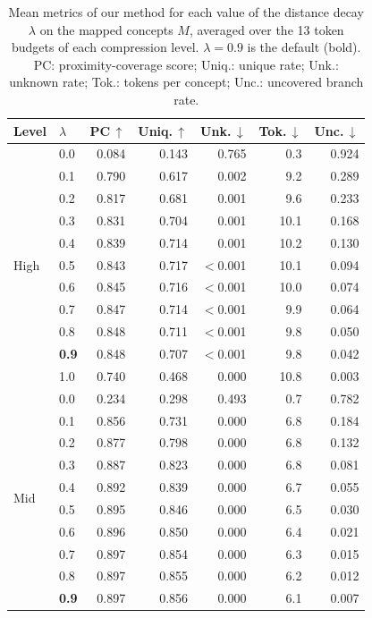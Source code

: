 \begin{table}[htbp]
\centering
\caption{Mean metrics of our method for each value of the distance decay $\lambda$ on the mapped concepts $M$, averaged over the 13 token budgets of each compression level. $\lambda = 0.9$ is the default (bold). PC: proximity-coverage score; Uniq.: unique rate; Unk.: unknown rate; Tok.: tokens per concept; Unc.: uncovered branch rate.}
\label{tab:lambda}
\footnotesize
\setlength{\tabcolsep}{4pt}
\begin{tabular}{@{}llrrrrr@{}}
\toprule
Level & $\lambda$ & PC\,$\uparrow$ & Uniq.\,$\uparrow$ & Unk.\,$\downarrow$ & Tok.\,$\downarrow$ & Unc.\,$\downarrow$ \\
\midrule
\multirow{11}{*}{High} & 0.0 & 0.084 & 0.143 & 0.765 & 0.3 & 0.924 \\
 & 0.1 & 0.790 & 0.617 & 0.002 & 9.2 & 0.289 \\
 & 0.2 & 0.817 & 0.681 & 0.001 & 9.6 & 0.233 \\
 & 0.3 & 0.831 & 0.704 & 0.001 & 10.1 & 0.168 \\
 & 0.4 & 0.839 & 0.714 & 0.001 & 10.2 & 0.130 \\
 & 0.5 & 0.843 & 0.717 & $<$0.001 & 10.1 & 0.094 \\
 & 0.6 & 0.845 & 0.716 & $<$0.001 & 10.0 & 0.074 \\
 & 0.7 & 0.847 & 0.714 & $<$0.001 & 9.9 & 0.064 \\
 & 0.8 & 0.848 & 0.711 & $<$0.001 & 9.8 & 0.050 \\
 & \textbf{0.9} & 0.848 & 0.707 & $<$0.001 & 9.8 & 0.042 \\
 & 1.0 & 0.740 & 0.468 & 0.000 & 10.8 & 0.003 \\
\midrule
\multirow{11}{*}{Mid} & 0.0 & 0.234 & 0.298 & 0.493 & 0.7 & 0.782 \\
 & 0.1 & 0.856 & 0.731 & 0.000 & 6.8 & 0.184 \\
 & 0.2 & 0.877 & 0.798 & 0.000 & 6.8 & 0.132 \\
 & 0.3 & 0.887 & 0.823 & 0.000 & 6.8 & 0.081 \\
 & 0.4 & 0.892 & 0.839 & 0.000 & 6.7 & 0.055 \\
 & 0.5 & 0.895 & 0.846 & 0.000 & 6.5 & 0.030 \\
 & 0.6 & 0.896 & 0.850 & 0.000 & 6.4 & 0.021 \\
 & 0.7 & 0.897 & 0.854 & 0.000 & 6.3 & 0.015 \\
 & 0.8 & 0.897 & 0.855 & 0.000 & 6.2 & 0.012 \\
 & \textbf{0.9} & 0.897 & 0.856 & 0.000 & 6.1 & 0.007 \\

\end{tabular}
\end{table}
